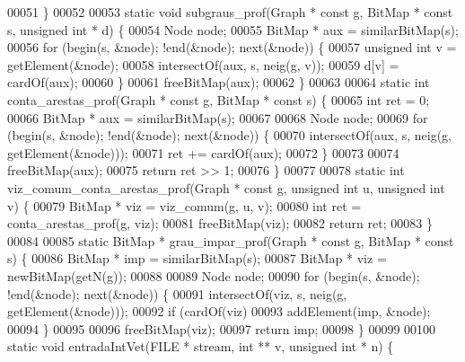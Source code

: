 \begin{DoxyCode}
00051 \}
00052 
00053 \textcolor{keyword}{static} \textcolor{keywordtype}{void} subgraus\_prof(Graph * \textcolor{keyword}{const} g, BitMap * \textcolor{keyword}{const} s, \textcolor{keywordtype}{unsigned} \textcolor{keywordtype}{int} * d) \{
00054         Node node;
00055         BitMap * aux = similarBitMap(s);
00056         \textcolor{keywordflow}{for} (begin(s, &node); !end(&node); next(&node)) \{
00057                 \textcolor{keywordtype}{unsigned} \textcolor{keywordtype}{int} v = getElement(&node);
00058                 intersectOf(aux, s, neig(g, v));
00059                 d[v] = cardOf(aux);
00060         \}
00061         freeBitMap(aux);
00062 \}
00063 
00064 \textcolor{keyword}{static} \textcolor{keywordtype}{int} conta\_arestas\_prof(Graph * \textcolor{keyword}{const} g, BitMap * \textcolor{keyword}{const} s) \{
00065         \textcolor{keywordtype}{int} ret = 0;
00066         BitMap * aux = similarBitMap(s);
00067 
00068         Node node;
00069         \textcolor{keywordflow}{for} (begin(s, &node); !end(&node); next(&node)) \{
00070                 intersectOf(aux, s, neig(g, getElement(&node)));
00071                 ret += cardOf(aux);
00072         \}
00073 
00074         freeBitMap(aux);
00075         \textcolor{keywordflow}{return} ret >> 1;
00076 \}
00077 
00078 \textcolor{keyword}{static} \textcolor{keywordtype}{int} viz\_comum\_conta\_arestas\_prof(Graph * \textcolor{keyword}{const} g, \textcolor{keywordtype}{unsigned} \textcolor{keywordtype}{int} u, \textcolor{keywordtype}{unsigned} \textcolor{keywordtype}{int} v) \{
00079         BitMap * viz = viz_comum(g, u, v);
00080         \textcolor{keywordtype}{int} ret = conta\_arestas\_prof(g, viz);
00081         freeBitMap(viz);
00082         \textcolor{keywordflow}{return} ret;
00083 \}
00084 
00085 \textcolor{keyword}{static} BitMap * grau\_impar\_prof(Graph * \textcolor{keyword}{const} g, BitMap * \textcolor{keyword}{const} s) \{
00086         BitMap * imp = similarBitMap(s);
00087         BitMap * viz = newBitMap(getN(g));
00088 
00089         Node node;
00090         \textcolor{keywordflow}{for} (begin(s, &node); !end(&node); next(&node)) \{
00091                 intersectOf(viz, s, neig(g, getElement(&node)));
00092                 \textcolor{keywordflow}{if} (cardOf(viz) %
00093                         addElement(imp, &node);
00094         \}
00095 
00096         freeBitMap(viz);
00097         \textcolor{keywordflow}{return} imp;
00098 \}
00099 
00100 \textcolor{keyword}{static} \textcolor{keywordtype}{void} entradaIntVet(FILE * stream, \textcolor{keywordtype}{int} ** v, \textcolor{keywordtype}{unsigned} \textcolor{keywordtype}{int} * n) \{

\end{DoxyCode}
